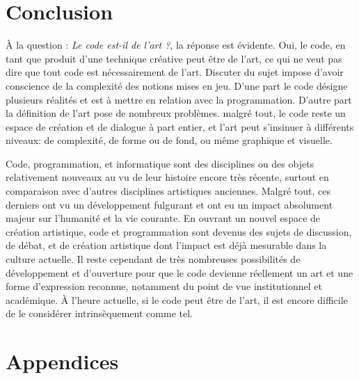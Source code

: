\documentclass[12pt]{article} %
\begin{document}
\section{Conclusion}
À la question : \textit{Le code est-il de l'art ?}, la réponse est évidente. Oui, le code, en tant que produit d'une technique créative peut être de l'art, ce qui ne veut pas dire que tout code est nécessairement de l'art. Discuter du sujet impose d'avoir conscience de la complexité des notions mises en jeu. D'une part le code désigne plusieurs réalités et est à mettre en relation avec la programmation. D'autre part la définition de l'art pose de nombreux problèmes. malgré tout, le code reste un espace de création et de dialogue à part entier, et l'art peut s'insinuer à différents niveaux: de complexité, de forme ou de fond, ou même graphique et visuelle.

Code, programmation, et informatique sont des disciplines ou des objets relativement nouveaux au vu de leur histoire encore très récente, surtout en comparaison avec d'autres disciplines artistiques anciennes. Malgré tout, ces derniers ont vu un développement fulgurant et ont eu un impact absolument majeur sur l'humanité et la vie courante. En ouvrant un nouvel espace de création artistique, code et programmation sont devenus des sujets de discussion, de débat, et de création artistique dont l'impact est déjà mesurable dans la culture actuelle. Il reste cependant de très nombreuses possibilités de développement et d'ouverture pour que le code devienne réellement un art et une forme d'expression reconnue, notamment du point de vue institutionnel et académique. À l'heure actuelle, si le code peut être de l'art, il est encore difficile de le considérer intrinsèquement comme tel.

\newpage
\section{Appendices}

\printglossary[type=\acronymtype]

\printglossary


\newpage



\restoregeometry
\end{document}

